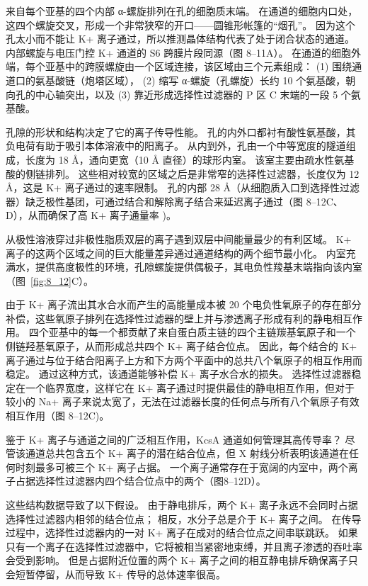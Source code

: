 来自每个亚基的四个内部 α-螺旋排列在孔的细胞质末端。
在通道的细胞内口处，这四个螺旋交叉，形成一个非常狭窄的开口——圆锥形帐篷的“烟孔”。
因为这个孔太小而不能让 K+ 离子通过，所以推测晶体结构代表了处于闭合状态的通道。
内部螺旋与电压门控 K+ 通道的 S6 跨膜片段同源（图 8–11A）。
在通道的细胞外端，每个亚基中的跨膜螺旋由一个区域连接，该区域由三个元素组成：
(1) 围绕通道口的氨基酸链（炮塔区域），
(2) 缩写 α-螺旋（孔螺旋）长约 10 个氨基酸，朝向孔的中心轴突出，以及
(3) 靠近形成选择性过滤器的 P 区 C 末端的一段 5 个氨基酸。


孔隙的形状和结构决定了它的离子传导性能。
孔的内外口都衬有酸性氨基酸，其负电荷有助于吸引本体溶液中的阳离子。
从内到外，孔由一个中等宽度的隧道组成，长度为 18 Å，通向更宽（10 Å 直径）的球形内室。
该室主要由疏水性氨基酸的侧链排列。
这些相对较宽的区域之后是非常窄的选择性过滤器，长度仅为 12 Å，这是 K+ 离子通过的速率限制。
孔的内部 28 Å（从细胞质入口到选择性过滤器）缺乏极性基团，可通过结合和解除离子结合来延迟离子通过（图 8–12C、D），从而确保了高 K+ 离子通量率 )。


从极性溶液穿过非极性脂质双层的离子遇到双层中间能量最少的有利区域。
K+ 离子的这两个区域之间的巨大能量差异通过通道结构的两个细节最小化。
内室充满水，提供高度极性的环境，孔隙螺旋提供偶极子，其电负性羧基末端指向该内室（图~\ref{fig:8_12}C）。


由于 K+ 离子流出其水合水而产生的高能量成本被 20 个电负性氧原子的存在部分补偿，这些氧原子排列在选择性过滤器的壁上并与渗透离子形成有利的静电相互作用。 
四个亚基中的每一个都贡献了来自蛋白质主链的四个主链羰基氧原子和一个侧链羟基氧原子，从而形成总共四个 K+ 离子结合位点。
因此，每个结合的 K+ 离子通过与位于结合阳离子上方和下方两个平面中的总共八个氧原子的相互作用而稳定。 
通过这种方式，该通道能够补偿 K+ 离子水合水的损失。
选择性过滤器稳定在一个临界宽度，这样它在 K+ 离子通过时提供最佳的静电相互作用，但对于较小的 Na+ 离子来说太宽了，无法在过滤器长度的任何点与所有八个氧原子有效相互作用（图 8–12C)。


鉴于 K+ 离子与通道之间的广泛相互作用，KcsA 通道如何管理其高传导率？
尽管该通道总共包含五个 K+ 离子的潜在结合位点，但 X 射线分析表明该通道在任何时刻最多可被三个 K+ 离子占据。
一个离子通常存在于宽阔的内室中，两个离子占据选择性过滤器内四个结合位点中的两个（图8–12D）。


这些结构数据导致了以下假设。
由于静电排斥，两个 K+ 离子永远不会同时占据选择性过滤器内相邻的结合位点；
相反，水分子总是介于 K+ 离子之间。
在传导过程中，选择性过滤器内的一对 K+ 离子在成对的结合位点之间串联跳跃。
如果只有一个离子在选择性过滤器中，它将被相当紧密地束缚，并且离子渗透的吞吐率会受到影响。
但是占据附近位置的两个 K+ 离子之间的相互静电排斥确保离子只会短暂停留，从而导致 K+ 传导的总体速率很高。


